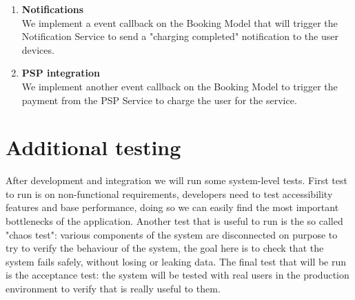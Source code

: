 \begin{enumerate}
	\item \textbf{Notifications}\\ We implement a event callback on the Booking Model that will trigger the Notification Service to send a "charging completed" notification to the user devices.
	\item \textbf{PSP integration}\\ We implement another event callback on the Booking Model to trigger the payment from the PSP Service to charge the user for the service.
\end{enumerate}
\newpage

\section{Additional testing}
After development and integration we will run some system-level tests.
First test to run is on non-functional requirements, developers need to test accessibility features and base performance, doing so we can easily find the most important bottlenecks of the application.
Another test that is useful to run is the so called "chaos test": various components of the system are disconnected on purpose to try to verify the behaviour of the system, the goal here is to check that the system fails safely, without losing or leaking data. 
The final test that will be run is the acceptance test: the system will be tested with real users in the production environment to verify that is really useful to them.






